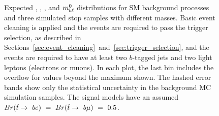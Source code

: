 \begin{figure}
{  }
  \caption{
    Expected \MLL, \HT, \MBLASYM, and $m_{b\ell}^0$ distributions for SM
    background processes and three simulated stop samples with different masses.
    Basic event cleaning is applied and the events are required to pass the
    trigger selection, as described in
    Sections~\ref{sec:event_cleaning}~and~\ref{sec:trigger_selection}, and the
    events are required to have at least two $b$-tagged jets and two light
    leptons (electrons or muons).
    In each plot, the last bin includes the overflow for values beyond the
    maximum shown. The hashed error bands show only the statistical
    uncertainty in the background MC simulation samples. The signal
    models have an assumed
    $Br(\tilde{t}\rightarrow~be)~=~Br(\tilde{t}\rightarrow~b\mu)~=~0.5$.
  }
  \label{fig:no_data__no_k__inclusive_flavor_all__kinematic_dists}
\end{figure}

